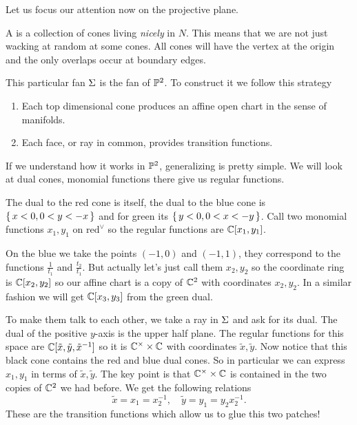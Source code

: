 \documentclass[12pt]{memoir}
\begin{document}
Let us focus our attention now on the projective plane.

\begin{Def}
    A  is a collection of cones living \emph{nicely} in $N$. This means that we are not just wacking at random at some cones. All cones will have the vertex at the origin and the only overlaps occur at boundary edges. 
\end{Def}

This particular fan $\Sigma$ is the fan of $\mathbb{P}^2$. To construct it we follow this strategy 
\begin{enumerate}
    \item Each top dimensional cone produces an affine open chart in the sense of manifolds.
    \item Each face, or ray in common, provides transition functions. 
\end{enumerate}

If we understand how it works in $\mathbb{P}^2$, generalizing is pretty simple. We will look at dual cones, monomial functions there give us regular functions. 

\begin{Ex}
    The dual to the red cone is itself, the dual to the blue cone is $\{\,x<0,0<y<-x\,\}$ and for green its $\{\,y<0,0<x<-y\,\}$. Call two monomial functions $x_1,y_1$ on $\text{red}^{\lor}$ so the regular functions are $\mathbb{C}[x_1,y_1]$.\par 
    On the blue we take the points $(-1,0)$ and $(-1,1)$, they correspond to the functions $\frac{1}{t_1}$ and $\frac{t_2}{t_1}$. But actually let's just call them $x_2,y_2$ so the coordinate ring is $\mathbb{C}[x_2,y_2]$ so our affine chart is a copy of $\mathbb{C}^2$ with coordinates $x_2,y_2$. In a similar fashion we will get $\mathbb{C}[x_3,y_3]$ from the green dual.\par 
    To make them talk to each other, we take a ray in $\Sigma$ and ask for its dual. The dual of the positive $y$-axis is the upper half plane. The regular functions for this space are $\mathbb{C}[\tilde x,\tilde y,\tilde x^{-1}]$ so it is $\mathbb{C}^\times\times\mathbb{C}$ with coordinates $\tilde x,\tilde y$. Now notice that this black cone contains the red and blue dual cones. So in particular we can express $x_1,y_1$ in terms of $\tilde x, \tilde y$. The key point is that $\mathbb{C}^\times\times\mathbb{C}$ is contained in the two copies of $\mathbb{C}^2$ we had before. We get the following relations 
    $$\tilde x=x_1=x_2^{-1},\quad \tilde y=y_1=y_2x_2^{-1}.$$
    These are the transition functions which allow us to glue this two patches! 
\end{Ex}
\end{document}
